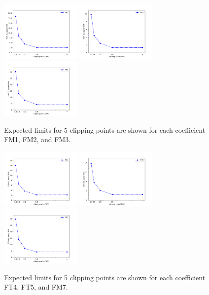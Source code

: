 \begin{figure}[ht]
    \centering
    	\includegraphics[width=0.35\textwidth]{figures/aQGC/ClippedFM1.pdf}
    	\includegraphics[width=0.35\textwidth]{figures/aQGC/ClippedFM2.pdf}
    	\includegraphics[width=0.35\textwidth]{figures/aQGC/ClippedFM3.pdf}
        \caption{Expected limits for 5 clipping points are shown for each coefficient FM1, FM2, and FM3.}
\end{figure}

\begin{figure}[ht]
    \centering
    	\includegraphics[width=0.35\textwidth]{figures/aQGC/ClippedFM4.pdf}
    	\includegraphics[width=0.35\textwidth]{figures/aQGC/ClippedFM5.pdf}
    	\includegraphics[width=0.35\textwidth]{figures/aQGC/ClippedFM7.pdf}
        \caption{Expected limits for 5 clipping points are shown for each coefficient FT4, FT5, and FM7.}
\end{figure}

